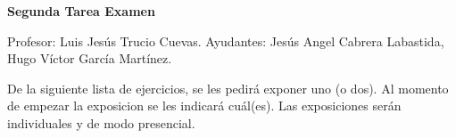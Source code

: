 \documentclass[11pt]{article}
\begin{document}
   

  \begin{center}
   \Huge \textbf{Segunda Tarea Examen} \\
  \end{center}

  \begin{flushright}
   \footnotesize Profesor: Luis Jesús Trucio Cuevas. \hfill Ayudantes: Jesús Angel Cabrera Labastida,\\
   \hfill Hugo Víctor García Martínez.
  \end{flushright}

  \footnotesize De la siguiente lista de ejercicios, se les pedirá exponer uno (o dos). Al momento de empezar la exposicion se les indicará cuál(es). Las exposiciones serán individuales y de modo presencial.
  \normalsize
\end{document}
